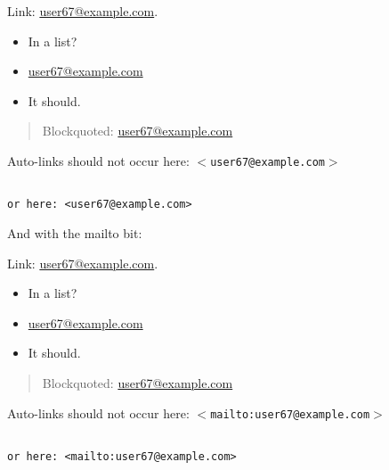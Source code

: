 
\def\mytitle{Email Test  }

Link: \href{mailto:user67@example.com}{user67@example.com}.

\begin{itemize}
\item In a list?

\item \href{mailto:user67@example.com}{user67@example.com}

\item It should.
\end{itemize}

\begin{quote}
Blockquoted: \href{mailto:user67@example.com}{user67@example.com}
\end{quote}

Auto-links should not occur here: \texttt{$<$user67@example.com$>$}

\begin{verbatim}

or here: <user67@example.com>

\end{verbatim}


And with the mailto bit:

Link: \href{mailto:user67@example.com}{user67@example.com}.

\begin{itemize}
\item In a list?

\item \href{mailto:user67@example.com}{user67@example.com}

\item It should.
\end{itemize}

\begin{quote}
Blockquoted: \href{mailto:user67@example.com}{user67@example.com}
\end{quote}

Auto-links should not occur here: \texttt{$<$mailto:user67@example.com$>$}

\begin{verbatim}

or here: <mailto:user67@example.com>

\end{verbatim}





